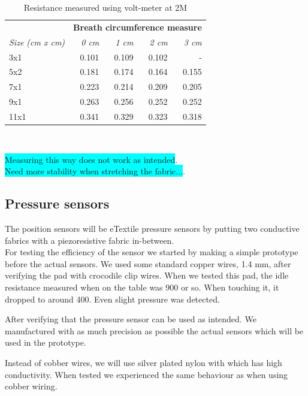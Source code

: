 \documentclass{sigchi-ext}
\begin{document}
\begin{table}
  \centering
  \begin{tabular}{l r r r r}
    & \multicolumn{4}{l}{\small{\textbf{Breath circumference measure}}} \\
    \cmidrule(r){1-2}
    {\small\textit{Size (cm x cm)}}
    & {\small \textit{0 cm}} 
    & {\small \textit{1 cm}} 
    & {\small \textit{2 cm}} 
    & {\small \textit{3 cm}} \\
    \midrule
    3x1    & 0.101 & 0.109 & 0.102 & - \\
    5x2    & 0.181 & 0.174 & 0.164 & 0.155 \\
    7x1    & 0.223 & 0.214 & 0.209 & 0.205 \\
    9x1    & 0.263 & 0.256 & 0.252 & 0.252 \\
    11x1    & 0.341 & 0.329 & 0.323 & 0.318 \\
  \end{tabular}
  \caption{Resistance measured using volt-meter at 2M}~\label{tab:circumference}
\end{table}

\colorbox{cyan}{Measuring this way does not work as intended}.\\
\colorbox{cyan}{Need more stability when stretching the fabric...}.

\subsection{Pressure sensors}
The position sensors will be eTextile pressure sensors by putting two conductive
fabrics with a piezoresistive fabric in-between.\\
For testing
the efficiency of the sensor we started by making a 
simple prototype before the actual sensors.
We used some standard copper wires, 1.4 mm, after verifying the pad with
crocodile clip wires. When we tested this pad, the idle resistance measured when on the table was
900 or so. When touching it, it dropped to around 400. Even slight pressure
was detected.

After verifying that the pressure sensor can be used as 
intended. We manufactured with as much precision as possible
the actual sensors which will be used in the prototype. 

Instead of cobber wires, we will use silver plated nylon
with which has high conductivity. When tested we experienced
the same behaviour as when using cobber wiring.
\end{document}
